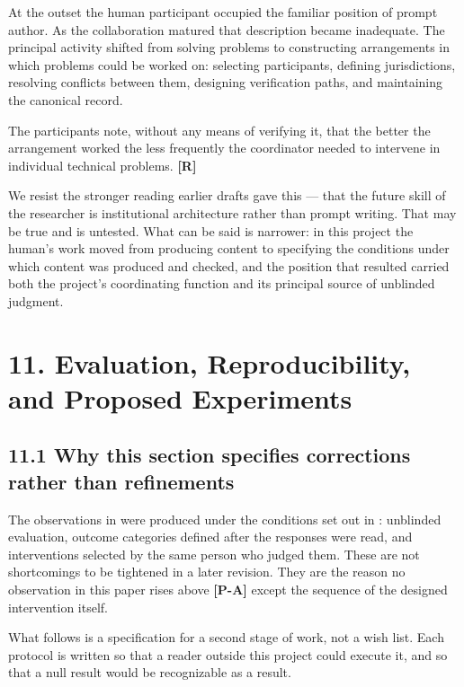 At the outset the human participant occupied the familiar position of prompt author. As the collaboration matured that description became inadequate. The principal activity shifted from solving problems to constructing arrangements in which problems could be worked on: selecting participants, defining jurisdictions, resolving conflicts between them, designing verification paths, and maintaining the canonical record.

The participants note, without any means of verifying it, that the better the arrangement worked the less frequently the coordinator needed to intervene in individual technical problems. \textbf{[R]}

We resist the stronger reading earlier drafts gave this — that the future skill of the researcher is institutional architecture rather than prompt writing. That may be true and is untested. What can be said is narrower: in this project the human's work moved from producing content to specifying the conditions under which content was produced and checked, and the position that resulted carried both the project's coordinating function and its principal source of unblinded judgment.


\section*{11. Evaluation, Reproducibility, and Proposed Experiments}
\label{sec:en:11}


\subsection*{11.1 Why this section specifies corrections rather than refinements}
\label{sec:en:11.1}

The observations in  were produced under the conditions set out in : unblinded evaluation, outcome categories defined after the responses were read, and interventions selected by the same person who judged them. These are not shortcomings to be tightened in a later revision. They are the reason no observation in this paper rises above \textbf{[P-A]} except the sequence of the designed intervention itself.

What follows is a specification for a second stage of work, not a wish list. Each protocol is written so that a reader outside this project could execute it, and so that a null result would be recognizable as a result.


